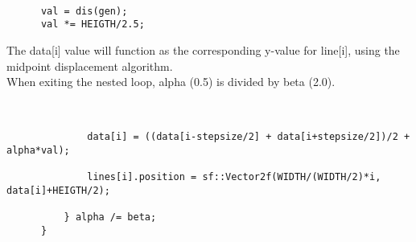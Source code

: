 \documentclass[11pt]{amsart}
\begin{document}
\begin{verbatim}

      val = dis(gen);
      val *= HEIGTH/2.5;

\end{verbatim}

The data[i] value will function as the corresponding y-value for line[i], using
the midpoint displacement algorithm. \\

When exiting the nested loop, alpha (0.5) is divided by beta (2.0). \\\\

\begin{verbatim}

              data[i] = ((data[i-stepsize/2] + data[i+stepsize/2])/2 + alpha*val);

              lines[i].position = sf::Vector2f(WIDTH/(WIDTH/2)*i, data[i]+HEIGTH/2);

          } alpha /= beta;
      }

\end{verbatim}
\end{document}
